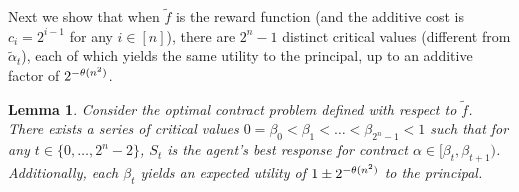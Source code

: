 \documentclass[11pt]{article}
\newtheorem{lemma}{Lemma}
\newcommand{\tf}{\tilde{f}}
\newcommand{\talpha}{\tilde{\alpha}}
\begin{document}
Next we show that when $\tf$ is the reward function (and the additive cost is $c_i = 2^{i-1}$ for any $i \in [n]$), there are $2^n-1$ distinct critical values (different from $\talpha_t$), each of which yields the same utility to the principal, up to an additive factor of $2^{-\theta(n^2)}$.

\begin{lemma}\label{lem:TildeCVs}
Consider the optimal contract problem defined with respect to $\tf$. There exists a series of critical values $0 = \beta_0 < \beta_1 < \ldots < \beta_{2^n-1} < 1$ such that for any $t \in \{0, \ldots, 2^n-2\}$, $S_t$ is the agent's best response for contract $\alpha \in [\beta_t, \beta_{t+1})$.
Additionally, each $\beta_t$ yields an expected utility of $1 \pm 2^{-\theta(n^2)}$ to the principal.
\end{lemma}
\end{document}
